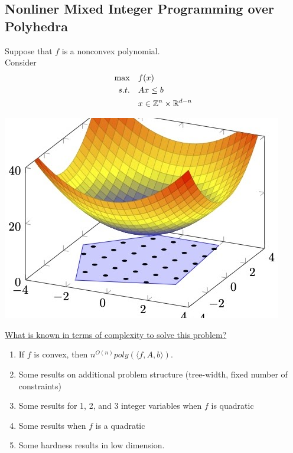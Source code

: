 \documentclass{article}
\begin{document}
\subsection{Nonliner Mixed Integer Programming over Polyhedra}
\begin{minipage}{0.5\textwidth}
Suppose that $f$ is a nonconvex polynomial.\\
  Consider
\begin{equation}
\label{eq:ILP}
\begin{split}
\max \quad & f(x)\\
s.t.  \quad & Ax \leq b\\
& x \in {\mathbb{Z}}^n \times \mathbb{R}^{d-n}
\end{split}
\end{equation}
\end{minipage}
\begin{minipage}{0.5\textwidth}
\begin{center}
\includegraphics[scale = 0.3]{presentation_figures/minlp}
\end{center}
\end{minipage}
\underline{What is known in terms of complexity to solve this problem?}
\begin{enumerate}
\item If $f$ is convex, then $n^{O(n)}poly(\langle f, A, b\rangle)$.
\item Some results on additional problem structure (tree-width, fixed number of constraints)
\item Some results for 1, 2, and 3 integer variables when $f$ is quadratic
\item Some results when $f$ is a quadratic
\item Some hardness results in low dimension.
\end{enumerate}
\end{document}
